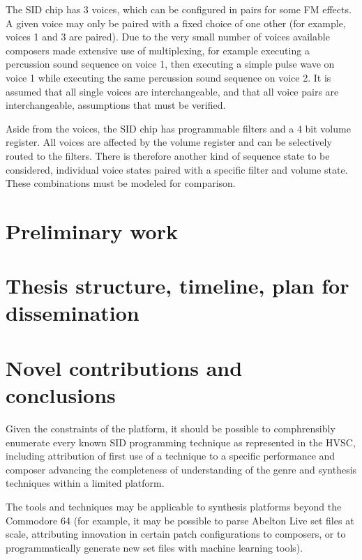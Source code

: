 \documentclass[10pt]{article}
\begin{document}
\begin{multicols*}{2}
  The SID chip has 3 voices, which can be configured in pairs for some
  FM effects. A given voice may only be paired with a fixed choice of one
  other (for example, voices 1 and 3 are paired). Due to the very small
  number of voices available composers made extensive use of multiplexing,
  for example executing a percussion sound sequence on voice 1, then executing
  a simple pulse wave on voice 1 while executing the same percussion sound
  sequence on voice 2. It is assumed that all single voices are interchangeable,
  and that all voice pairs are interchangeable, assumptions that must be
  verified.

  Aside from the voices, the SID chip has programmable filters and
  a 4 bit volume register. All voices are affected by the volume
  register and can be selectively routed to the filters. There is
  therefore another kind of sequence state to be considered,
  individual voice states paired with a specific filter and volume
  state. These combinations must be modeled for comparison.


\section{Preliminary work}

\section{Thesis structure, timeline, plan for dissemination}

\section{Novel contributions and conclusions}

Given the constraints of the platform, it should be possible to
comphrensibly enumerate every known SID programming technique as
represented in the HVSC, including attribution of first use of a
technique to a specific performance and composer advancing the
completeness of understanding of the genre and synthesis techniques
within a limited platform.

The tools and techniques may be applicable to synthesis platforms
beyond the Commodore 64 (for example, it may be possible to parse
Abelton Live set files at scale, attributing innovation in certain
patch configurations to composers, or to programmatically
generate new set files with machine learning tools).



\end{multicols*}
\end{document}
